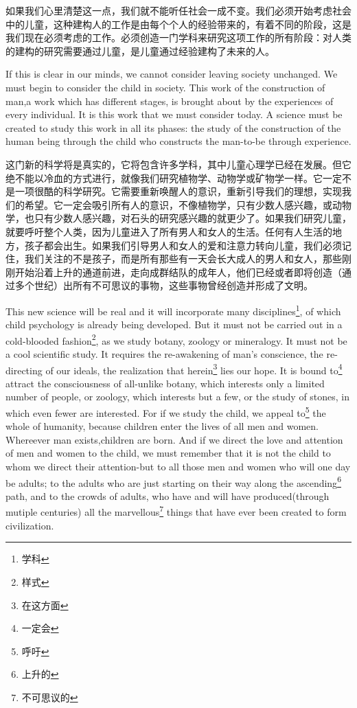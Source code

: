 \documentclass[lang=cn,10pt]{elegantbook}
\begin{document}
如果我们心里清楚这一点，我们就不能听任社会一成不变。我们必须开始考虑社会中的儿童，这种建构人的工作是由每个个人的经验带来的，有着不同的阶段，这是我们现在必须考虑的工作。必须创造一门学科来研究这项工作的所有阶段：对人类的建构的研究需要通过儿童，是儿童通过经验建构了未来的人。

If this is clear in our minds, we cannot consider leaving society unchanged. We must begin to consider the child in society. This work of the construction of man,a work which has different stages, is brought about by the experiences of every individual. It is this work that we must consider today. A science must be created to study this work in all its phases: the study of the construction of the human being through the child who constructs the man-to-be through experience.

这门新的科学将是真实的，它将包含许多学科，其中儿童心理学已经在发展。但它绝不能以冷血的方式进行，就像我们研究植物学、动物学或矿物学一样。它一定不是一项很酷的科学研究。它需要重新唤醒人的意识，重新引导我们的理想，实现我们的希望。它一定会吸引所有人的意识，不像植物学，只有少数人感兴趣，或动物学，也只有少数人感兴趣，对石头的研究感兴趣的就更少了。如果我们研究儿童，就要呼吁整个人类，因为儿童进入了所有男人和女人的生活。任何有人生活的地方，孩子都会出生。如果我们引导男人和女人的爱和注意力转向儿童，我们必须记住，我们关注的不是孩子，而是所有那些有一天会长大成人的男人和女人，那些刚刚开始沿着上升的通道前进，走向成群结队的成年人，他们已经或者即将创造（通过多个世纪）出所有不可思议的事物，这些事物曾经创造并形成了文明。

This new science will be real and it will incorporate many disciplines\footnote{学科}, of which child psychology is already being developed. But it must not be carried out in a cold-blooded fashion\footnote{样式}, as we study botany, zoology or mineralogy. It must not be a cool scientific study. It requires the re-awakening of man's conscience, the re-directing of our ideals, the realization that herein\footnote{在这方面} lies our hope. It is bound to\footnote{一定会} attract the consciousness of all-unlike botany, which interests only a limited number of people, or zoology, which interests but a few, or the study of stones, in which even fewer are interested. For if we study the child, we appeal to\footnote{呼吁} the whole of humanity, because children enter the lives of all men and women. Whereever man exists,children are born. And if we direct the love and attention of men and women to the child, we must remember that it is not the child to whom we direct their attention-but to all those men and women who will one day be adults; to the adults who are just starting on their way along the ascending\footnote{上升的} path, and to the crowds of adults, who have and will have produced(through mutiple centuries) all the marvellous\footnote{不可思议的} things that have ever been created to form civilization.
\end{document}

